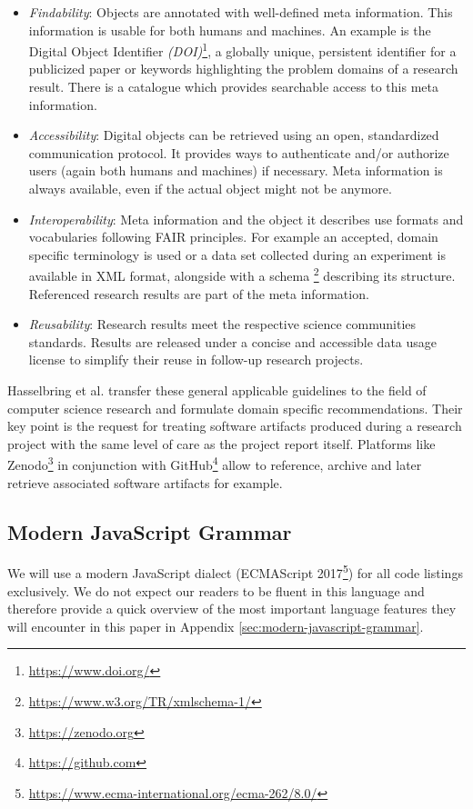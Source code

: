 \documentclass[12pt,a4paper]{article}
\begin{document}
\begin{itemize}
	\item \emph{Findability}: Objects are annotated with well-defined meta information. This information is usable for both humans and machines. An example is the Digital Object Identifier \emph{(DOI)}\footnote{\url{https://www.doi.org/}}, a globally unique, persistent identifier for a publicized paper or keywords highlighting the problem domains of a research result. There is a catalogue which provides searchable access to this meta information.
	\item \emph{Accessibility}: Digital objects can be retrieved using an open, standardized communication protocol. It provides ways to authenticate and/or authorize users (again both humans and machines) if necessary. Meta information is always available, even if the actual object might not be anymore.
	\item \emph{Interoperability}: Meta information and the object it describes use formats and vocabularies following FAIR principles. For example an accepted, domain specific terminology is used or a data set collected during an experiment is available in XML format, alongside with a schema \footnote{\url{https://www.w3.org/TR/xmlschema-1/}} describing its structure. Referenced research results are part of the meta information.
	\item \emph{Reusability}: Research results meet the respective science communities standards. Results are released under a concise and accessible data usage license to simplify their reuse in follow-up research projects.
\end{itemize}

Hasselbring et al. \cite{2019arXiv190805986H} transfer these general applicable guidelines to the field of computer science research and formulate domain specific recommendations. Their key point is the request for treating software artifacts produced during a research project with the same level of care as the project report itself. Platforms like Zenodo\footnote{\url{https://zenodo.org}} in conjunction with GitHub\footnote{\url{https://github.com}} allow to reference, archive and later retrieve associated software artifacts for example.

\subsection{Modern JavaScript Grammar}
We will use a modern JavaScript dialect (ECMAScript 2017\footnote{\url{https://www.ecma-international.org/ecma-262/8.0/}}) for all code listings exclusively. We do not expect our readers to be fluent in this language and therefore provide a quick overview of the most important language features they will encounter in this paper in Appendix \ref{sec:modern-javascript-grammar}.
\end{document}
